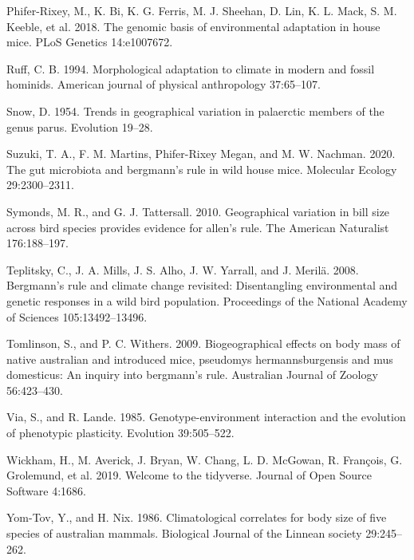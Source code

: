 \documentclass[]{article}
\begin{document}
\leavevmode\hypertarget{ref-Phifer-Rixey2018}{}%
Phifer-Rixey, M., K. Bi, K. G. Ferris, M. J. Sheehan, D. Lin, K. L.
Mack, S. M. Keeble, et al. 2018. The genomic basis of environmental
adaptation in house mice. PLoS Genetics 14:e1007672.

\leavevmode\hypertarget{ref-Ruff1994}{}%
Ruff, C. B. 1994. Morphological adaptation to climate in modern and
fossil hominids. American journal of physical anthropology 37:65--107.

\leavevmode\hypertarget{ref-Snow1954}{}%
Snow, D. 1954. Trends in geographical variation in palaerctic members of
the genus parus. Evolution 19--28.

\leavevmode\hypertarget{ref-Suzuki2020}{}%
Suzuki, T. A., F. M. Martins, Phifer-Rixey Megan, and M. W. Nachman.
2020. The gut microbiota and bergmann's rule in wild house mice.
Molecular Ecology 29:2300--2311.

\leavevmode\hypertarget{ref-Symonds2010}{}%
Symonds, M. R., and G. J. Tattersall. 2010. Geographical variation in
bill size across bird species provides evidence for allen's rule. The
American Naturalist 176:188--197.

\leavevmode\hypertarget{ref-Teplitsky2008}{}%
Teplitsky, C., J. A. Mills, J. S. Alho, J. W. Yarrall, and J. Merilä.
2008. Bergmann's rule and climate change revisited: Disentangling
environmental and genetic responses in a wild bird population.
Proceedings of the National Academy of Sciences 105:13492--13496.

\leavevmode\hypertarget{ref-Tomlinson2009}{}%
Tomlinson, S., and P. C. Withers. 2009. Biogeographical effects on body
mass of native australian and introduced mice, pseudomys
hermannsburgensis and mus domesticus: An inquiry into bergmann's rule.
Australian Journal of Zoology 56:423--430.

\leavevmode\hypertarget{ref-Via1985}{}%
Via, S., and R. Lande. 1985. Genotype-environment interaction and the
evolution of phenotypic plasticity. Evolution 39:505--522.

\leavevmode\hypertarget{ref-Wickham2019}{}%
Wickham, H., M. Averick, J. Bryan, W. Chang, L. D. McGowan, R. François,
G. Grolemund, et al. 2019. Welcome to the tidyverse. Journal of Open
Source Software 4:1686.

\leavevmode\hypertarget{ref-Yom-Tov1986}{}%
Yom-Tov, Y., and H. Nix. 1986. Climatological correlates for body size
of five species of australian mammals. Biological Journal of the Linnean
society 29:245--262.
\end{document}
